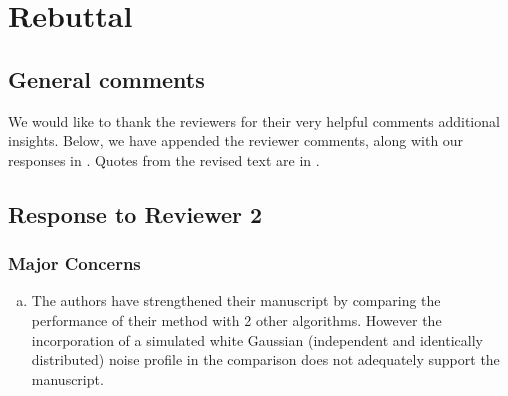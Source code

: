 % 
% 
% 
% 
% 
% 

\section*{Rebuttal} 

\setcounter{subsection}{0}
\subsection*{General comments} 

We would like to thank the reviewers for their very helpful comments additional insights.  Below, we have appended the reviewer comments, along with our responses in . Quotes from the revised text are in .  

\subsection{Response to Reviewer 2} %
\label{sec:response_to_reviewer_1}


\subsubsection{Major Concerns} %
\label{ssub:major_concerns}


\begin{enumerate}[a.]
	
	\item The authors have strengthened their manuscript by comparing the performance of their method with 2 other algorithms. However the incorporation of a simulated white Gaussian (independent and identically distributed) noise profile in the comparison does not adequately support the manuscript. 
	
	
\end{enumerate}

